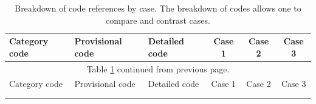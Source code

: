 \begin{landscape}
\footnotesize
\singlespacing

\begin{longtable}[c]{lllccc}
\caption[Breakdown of codes by case]{Breakdown of code references by case. The breakdown of codes allows one to compare and contrast cases.\label{tab:filtered_codes}} \\
\toprule
Category code & Provisional code & Detailed code & Case 1 & Case 2 & Case 3 \\
\endfirsthead

\multicolumn{6}{c}{Table \ref{tab:filtered_codes} continued from previous page.}\\
\toprule
Category code & Provisional code & Detailed code & Case 1 & Case 2 & Case 3 \\
\midrule
\endhead

\bottomrule \\
\endfoot

\bottomrule
\endlastfoot


\end{longtable}
\end{landscape}
